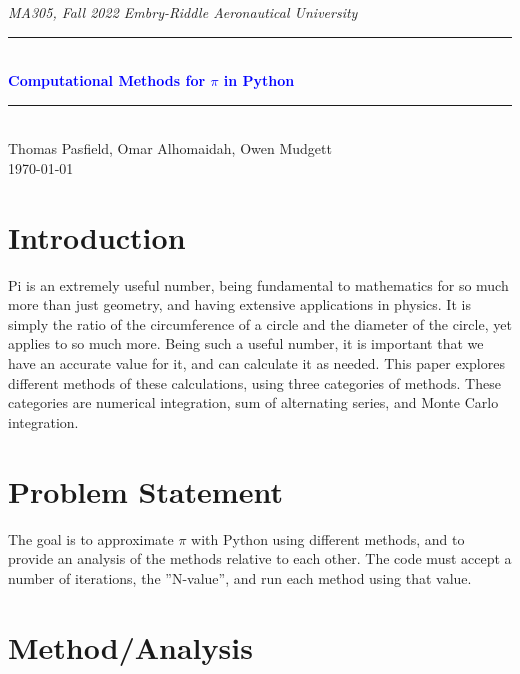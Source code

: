 \documentclass[11pt]{article}
\newcommand{\horrule}[1]{\rule{\linewidth}{#1}} 	%
\begin{document}
\begin{center}
{\it MA305, Fall 2022  \hfill Embry-Riddle Aeronautical University
 }\\
		\horrule{0.5pt} \\[0.4cm]
		\textcolor{blue}{\bf \Large  %
			Computational Methods for $\pi$ in Python
			}\\
		\horrule{2pt} \\[5cm]
		Thomas Pasfield, Omar Alhomaidah, Owen Mudgett  %
\\[0.4cm]
\today %
\end{center}
\thispagestyle{empty}
\newpage
\begin{abstract}
\end{abstract}
\tableofcontents 
\newpage

\section{Introduction}\label{S:1}

Pi is an extremely useful number, being fundamental to mathematics for so much more than just geometry, and having extensive applications in physics. It is simply the ratio of the circumference of a circle and the diameter of the circle, yet applies to so much more. Being such a useful number, it is important that we have an accurate value for it, and can calculate it as needed. This paper explores different methods of these calculations, using three categories of methods. These categories are numerical integration, sum of alternating series, and Monte Carlo integration.


\section{Problem Statement}\label{S:2}
The goal is to approximate $\pi$ with Python using different methods, and to provide an analysis of the methods relative to each other. The code must accept a number of iterations, the ''N-value'', and run each method using that value. 

\section{Method/Analysis}\label{S:3}
\end{document}
